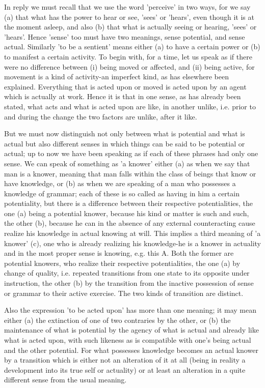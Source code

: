 In reply we must recall that we use the word 'perceive' in two ways,
for we say (a) that what has the power to hear or see, 'sees' or 'hears',
even though it is at the moment asleep, and also (b) that what is
actually seeing or hearing, 'sees' or 'hears'. Hence 'sense' too must
have two meanings, sense potential, and sense actual. Similarly 'to
be a sentient' means either (a) to have a certain power or (b) to
manifest a certain activity. To begin with, for a time, let us speak
as if there were no difference between (i) being moved or affected,
and (ii) being active, for movement is a kind of activity-an imperfect
kind, as has elsewhere been explained. Everything that is acted upon
or moved is acted upon by an agent which is actually at work. Hence
it is that in one sense, as has already been stated, what acts and
what is acted upon are like, in another unlike, i.e. prior to and
during the change the two factors are unlike, after it like.

But we must now distinguish not only between what is potential and
what is actual but also different senses in which things can be said
to be potential or actual; up to now we have been speaking as if each
of these phrases had only one sense. We can speak of something as
'a knower' either (a) as when we say that man is a knower, meaning
that man falls within the class of beings that know or have knowledge,
or (b) as when we are speaking of a man who possesses a knowledge
of grammar; each of these is so called as having in him a certain
potentiality, but there is a difference between their respective potentialities,
the one (a) being a potential knower, because his kind or matter is
such and such, the other (b), because he can in the absence of any
external counteracting cause realize his knowledge in actual knowing
at will. This implies a third meaning of 'a knower' (c), one who is
already realizing his knowledge-he is a knower in actuality and in
the most proper sense is knowing, e.g. this A. Both the former are
potential knowers, who realize their respective potentialities, the
one (a) by change of quality, i.e. repeated transitions from one state
to its opposite under instruction, the other (b) by the transition
from the inactive possession of sense or grammar to their active exercise.
The two kinds of transition are distinct. 

Also the expression 'to be acted upon' has more than one meaning;
it may mean either (a) the extinction of one of two contraries by
the other, or (b) the maintenance of what is potential by the agency
of what is actual and already like what is acted upon, with such likeness
as is compatible with one's being actual and the other potential.
For what possesses knowledge becomes an actual knower by a transition
which is either not an alteration of it at all (being in reality a
development into its true self or actuality) or at least an alteration
in a quite different sense from the usual meaning. 

